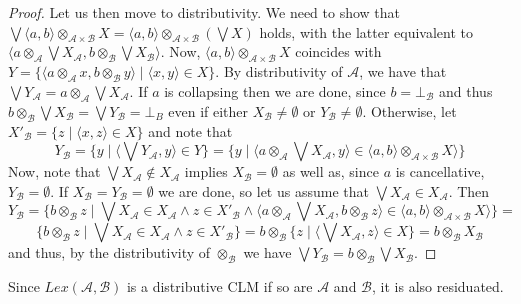 \documentclass[a4paper]{elsarticle}
\newcommand{\1}{\mathbf{1}}
\begin{document}
\begin{proof}
	Let us then move to distributivity. We need to show that
	$\bigvee \langle a, b\rangle \otimes_{\mathcal{A} \times \mathcal{B}} X = \langle a, b\rangle \otimes_{\mathcal{A} \times \mathcal{B}}  (\bigvee X)$ holds,
	with the latter equivalent to $\langle a \otimes_\mathcal{A} \bigvee X_\mathcal{A}, b \otimes_\mathcal{B} \bigvee X_\mathcal{B} \rangle$.
	Now, $\langle a, b\rangle \otimes_{\mathcal{A} \times \mathcal{B}} X$ coincides with 
	$Y = \{\langle a \otimes_\mathcal{A}  x,  b \otimes_\mathcal{B}  y \rangle \mid \langle x, y \rangle \in X\}$.
	By distributivity of $\mathcal{A}$, we have that $\bigvee Y_\mathcal{A} = a \otimes_\mathcal{A} \bigvee X_\mathcal{A}$.
	If $a$ is collapsing then we are done, since $b = \bot_\mathcal{B}$ and thus $b \otimes_\mathcal{B} \bigvee X_\mathcal{B} = 
	\bigvee Y_\mathcal{B} = \bot_{B}$
	even if either $X_\mathcal{B} \neq \emptyset$ or $Y_\mathcal{B} \neq \emptyset$. Otherwise, 
	let 
	$X'_\mathcal{B} = \{ z \mid \langle x, z\rangle \in X \}$ and note that 
	$$Y_\mathcal{B} = \{ y \mid \langle \bigvee Y_\mathcal{A}, y \rangle \in Y\}
	= \{ y \mid \langle a \otimes_\mathcal{A} \bigvee X_\mathcal{A}, y \rangle \in \langle a, b\rangle \otimes_{\mathcal{A} \times \mathcal{B}} X \rangle \}$$
	\noindent
	Now, note that $\bigvee X_\mathcal{A} \not \in X_\mathcal{A}$ implies $X_\mathcal{B} = \emptyset$ as well as, since $a$ is cancellative, $Y_\mathcal{B} = \emptyset$.
	If $X_\mathcal{B} = Y_\mathcal{B} = \emptyset$ we are done, so let us assume that $\bigvee X_\mathcal{A} \in X_\mathcal{A}$. Then
	$$Y_\mathcal{B} = \{ b \otimes_\mathcal{B}   z \mid \bigvee X_\mathcal{A} \in X_\mathcal{A} \wedge z \in X'_\mathcal{B} \wedge 
	      \langle a \otimes_\mathcal{A} \bigvee X_\mathcal{A}, b  \otimes_\mathcal{B} z \rangle \in \langle a, b\rangle \otimes_{\mathcal{A} \times \mathcal{B}} X \rangle \} =$$
	$$\{ b \otimes_\mathcal{B} z \mid  \bigvee X_\mathcal{A} \in X_\mathcal{A}  \wedge z \in X'_\mathcal{B}\} =
	    b \otimes_\mathcal{B} \{ z \mid \langle \bigvee X_\mathcal{A}, z \rangle \in X \} = b \otimes_\mathcal{B} X_\mathcal{B}$$
	\noindent
	and thus, by the distributivity of $\otimes_\mathcal{B}$ we have $\bigvee Y_\mathcal{B} = b \otimes_\mathcal{B} \bigvee X_\mathcal{B}$.
\end{proof}

Since $Lex(\mathcal{A},\mathcal{B})$ is a distributive CLM if so are $\mathcal{A}$ and $\mathcal{B}$, it is also residuated.
\end{document}
